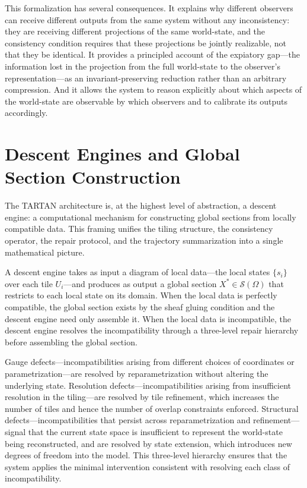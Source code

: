\documentclass[11pt, oneside]{article}
\begin{document}
This formalization has several consequences. It explains why different observers can receive different outputs from the same system without any inconsistency: they are receiving different projections of the same world-state, and the consistency condition requires that these projections be jointly realizable, not that they be identical. It provides a principled account of the expiatory gap---the information lost in the projection from the full world-state to the observer's representation---as an invariant-preserving reduction rather than an arbitrary compression. And it allows the system to reason explicitly about which aspects of the world-state are observable by which observers and to calibrate its outputs accordingly.

\section{Descent Engines and Global Section Construction}

The TARTAN architecture is, at the highest level of abstraction, a descent engine: a computational mechanism for constructing global sections from locally compatible data. This framing unifies the tiling structure, the consistency operator, the repair protocol, and the trajectory summarization into a single mathematical picture.

A descent engine takes as input a diagram of local data---the local states $\{s_i\}$ over each tile $U_i$---and produces as output a global section $X^\ast \in \mathcal{S}(\Omega)$ that restricts to each local state on its domain. When the local data is perfectly compatible, the global section exists by the sheaf gluing condition and the descent engine need only assemble it. When the local data is incompatible, the descent engine resolves the incompatibility through a three-level repair hierarchy before assembling the global section.

Gauge defects---incompatibilities arising from different choices of coordinates or parametrization---are resolved by reparametrization without altering the underlying state. Resolution defects---incompatibilities arising from insufficient resolution in the tiling---are resolved by tile refinement, which increases the number of tiles and hence the number of overlap constraints enforced. Structural defects---incompatibilities that persist across reparametrization and refinement---signal that the current state space is insufficient to represent the world-state being reconstructed, and are resolved by state extension, which introduces new degrees of freedom into the model. This three-level hierarchy ensures that the system applies the minimal intervention consistent with resolving each class of incompatibility.
\end{document}
